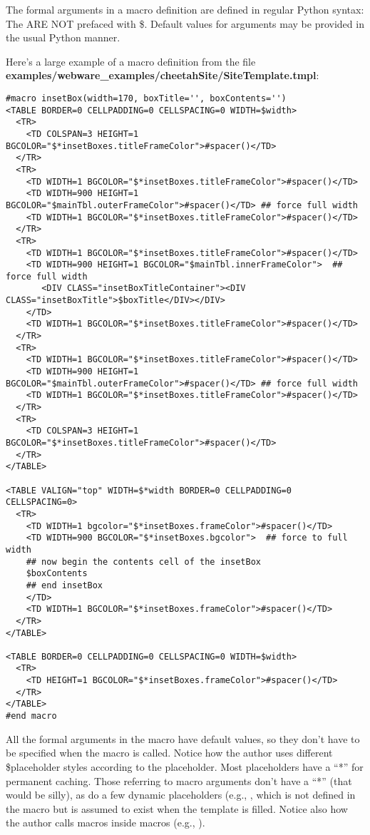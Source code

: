 The formal arguments in a macro definition are defined in regular Python syntax:
The ARE NOT prefaced with \$.  Default values for arguments
may be provided in the usual Python manner.

Here's a large example of a macro definition from the file
{\bf examples/webware\_examples/cheetahSite/SiteTemplate.tmpl}:

\begin{verbatim}
#macro insetBox(width=170, boxTitle='', boxContents='')
<TABLE BORDER=0 CELLPADDING=0 CELLSPACING=0 WIDTH=$width>
  <TR>
    <TD COLSPAN=3 HEIGHT=1 BGCOLOR="$*insetBoxes.titleFrameColor">#spacer()</TD>
  </TR>
  <TR>
    <TD WIDTH=1 BGCOLOR="$*insetBoxes.titleFrameColor">#spacer()</TD>
    <TD WIDTH=900 HEIGHT=1 BGCOLOR="$mainTbl.outerFrameColor">#spacer()</TD> ## force full width 
    <TD WIDTH=1 BGCOLOR="$*insetBoxes.titleFrameColor">#spacer()</TD>
  </TR>
  <TR>
    <TD WIDTH=1 BGCOLOR="$*insetBoxes.titleFrameColor">#spacer()</TD>
    <TD WIDTH=900 HEIGHT=1 BGCOLOR="$mainTbl.innerFrameColor">  ## force full width 
       <DIV CLASS="insetBoxTitleContainer"><DIV CLASS="insetBoxTitle">$boxTitle</DIV></DIV>
    </TD>
    <TD WIDTH=1 BGCOLOR="$*insetBoxes.titleFrameColor">#spacer()</TD>
  </TR>
  <TR>
    <TD WIDTH=1 BGCOLOR="$*insetBoxes.titleFrameColor">#spacer()</TD>
    <TD WIDTH=900 HEIGHT=1 BGCOLOR="$mainTbl.outerFrameColor">#spacer()</TD> ## force full width 
    <TD WIDTH=1 BGCOLOR="$*insetBoxes.titleFrameColor">#spacer()</TD>
  </TR>
  <TR>
    <TD COLSPAN=3 HEIGHT=1 BGCOLOR="$*insetBoxes.titleFrameColor">#spacer()</TD>
  </TR>
</TABLE>
            
<TABLE VALIGN="top" WIDTH=$*width BORDER=0 CELLPADDING=0 CELLSPACING=0>
  <TR>
    <TD WIDTH=1 bgcolor="$*insetBoxes.frameColor">#spacer()</TD>
    <TD WIDTH=900 BGCOLOR="$*insetBoxes.bgcolor">  ## force to full width 
    ## now begin the contents cell of the insetBox
    $boxContents
    ## end insetBox     
    </TD>
    <TD WIDTH=1 BGCOLOR="$*insetBoxes.frameColor">#spacer()</TD>
  </TR>
</TABLE>

<TABLE BORDER=0 CELLPADDING=0 CELLSPACING=0 WIDTH=$width>
  <TR>
    <TD HEIGHT=1 BGCOLOR="$*insetBoxes.frameColor">#spacer()</TD>
  </TR>
</TABLE>
#end macro
\end{verbatim}

All the formal arguments in the  macro have default values, so
they don't have to be specified when the macro is called.  Notice how the author
uses different \$placeholder styles according to the placeholder.  Most
placeholders have a ``*'' for permanent caching.  Those referring to macro
arguments don't have a ``*'' (that would be silly), as do a few dynamic
placeholders (e.g., , which is not defined in
the macro but is assumed to exist when the template is filled.  Notice also how
the author calls macros inside macros (e.g., ).

